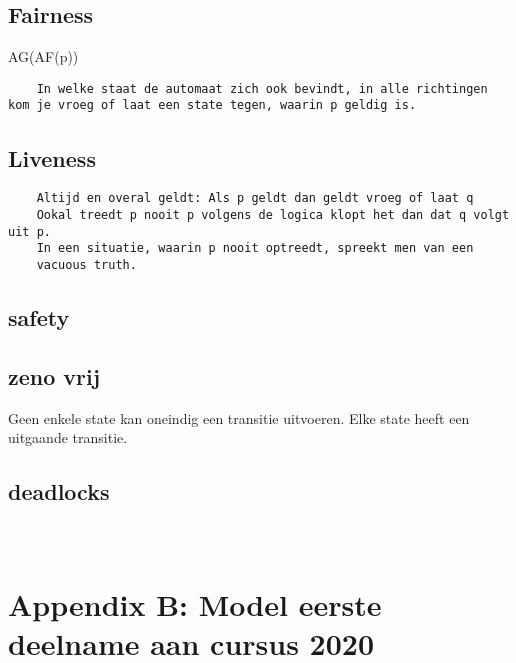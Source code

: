  \subsection{Fairness}
 AG(AF(p))
 \begin{verbatim}
 	In welke staat de automaat zich ook bevindt, in alle richtingen kom je vroeg of laat een state tegen, waarin p geldig is.
 \end{verbatim}
 \subsection{Liveness}
 \begin{verbatim}
 	Altijd en overal geldt: Als p geldt dan geldt vroeg of laat q
 	Ookal treedt p nooit p volgens de logica klopt het dan dat q volgt uit p.
 	In een situatie, waarin p nooit optreedt, spreekt men van een
 	vacuous truth.
 \end{verbatim}
 
 
 
 \subsection{safety}
 
 \subsection{zeno vrij}
 Geen enkele state kan oneindig een transitie uitvoeren. Elke state heeft een uitgaande transitie.
 
 \subsection{deadlocks}
 
 \newpage
 
 \section{\\ Appendix B: Model eerste deelname aan cursus 2020}
 

 
 
